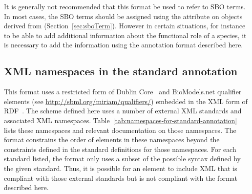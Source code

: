 It is generally not recommended that this format be used to refer
to SBO terms.  In most cases, the SBO terms should be assigned
using the attribute  on objects derived from \SBase
(Section~\ref{sec:sboTerm}).  However in certain situations, for
instance to be able to add additional information about the
functional role of a species, it is necessary to add the
information using the annotation format described here.


\subsection{XML namespaces in the standard annotation}

This format uses a restricted form of Dublin
Core~\citep{DCMI:2003} and BioModels.net qualifier elements (see
\url{http://sbml.org/miriam/qualifiers/}) embedded in the XML form
of RDF~\citep{w3c:2004}.  The scheme defined here uses a number of
external XML standards and associated XML namespaces.
Table~\ref{tab:namespaces-for-standard-annotation} lists these
namespaces and relevant documentation on those namespaces.  The
format constrains the order of elements in these namespaces beyond
the constraints defined in the standard definitions for those
namespaces.  For each standard listed, the format only uses a
subset of the possible syntax defined by the given standard.
Thus, it is possible for an  element to include
XML that is compliant with those external standards but is not
compliant with the format described here.

